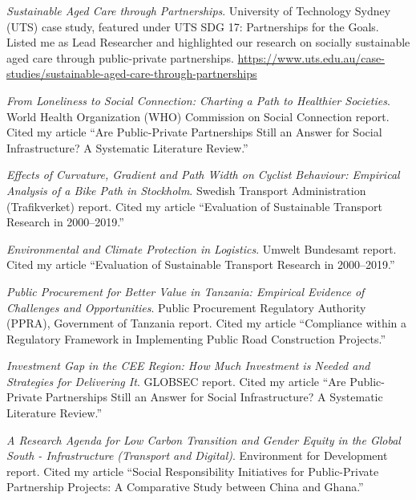 \documentclass[11pt,a4paper]{report} %
\begin{document}
    \begin{tablist}

        \item[2025] \tab{}\textit{Sustainable Aged Care through Partnerships}. University of Technology Sydney (UTS) case study, featured under UTS SDG 17: Partnerships for the Goals. Listed me as Lead Researcher and highlighted our research on socially sustainable aged care through public-private partnerships. \href{https://www.uts.edu.au/case-studies/sustainable-aged-care-through-partnerships}{https://www.uts.edu.au/case-studies/sustainable-aged-care-through-partnerships}

        \item[2025] \tab{}\textit{From Loneliness to Social Connection: Charting a Path to Healthier Societies}. World Health Organization (WHO) Commission on Social Connection report. Cited my article “Are Public-Private Partnerships Still an Answer for Social Infrastructure? A Systematic Literature Review.”

        \item[2025] \tab{}\textit{Effects of Curvature, Gradient and Path Width on Cyclist Behaviour: Empirical Analysis of a Bike Path in Stockholm}. Swedish Transport Administration (Trafikverket) report. Cited my article “Evaluation of Sustainable Transport Research in 2000--2019.”        

        \item[2025] \tab{}\textit{Environmental and Climate Protection in Logistics}. Umwelt Bundesamt report. Cited my article “Evaluation of Sustainable Transport Research in 2000--2019.”        

        \item[2024] \tab{}\textit{Public Procurement for Better Value in Tanzania: Empirical Evidence of Challenges and Opportunities}. Public Procurement Regulatory Authority (PPRA), Government of Tanzania report. Cited my article “Compliance within a Regulatory Framework in Implementing Public Road Construction Projects.”   

        \item[2023] \tab{}\textit{Investment Gap in the CEE Region: How Much Investment is Needed and Strategies for Delivering It}. GLOBSEC report. Cited my article “Are Public-Private Partnerships Still an Answer for Social Infrastructure? A Systematic Literature Review.”

        \item[2023] \tab{}\textit{A Research Agenda for Low Carbon Transition and Gender Equity in the Global South - Infrastructure (Transport and Digital)}. Environment for Development report. Cited my article “Social Responsibility Initiatives for Public-Private Partnership Projects: A Comparative Study between China and Ghana.”
    

\end{tablist}
\end{document}
